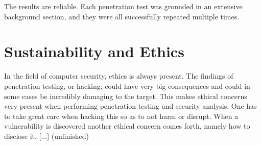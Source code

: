 The results are reliable. Each penetration test was grounded in an extensive background section, and they were all successfully repeated multiple times.

\section{Sustainability and Ethics}
In the field of computer security, ethics is always present. The findings of penetration testing, or hacking, could have very big consequences and could in some cases be incredibly damaging to the target. This makes ethical concerns very present when performing penetration testing and security analysis. One has to take great care when hacking this so as to not harm or disrupt. When a vulnerability is discovered another ethical concern comes forth, namely how to disclose it. [...] \todo (unfinished)
